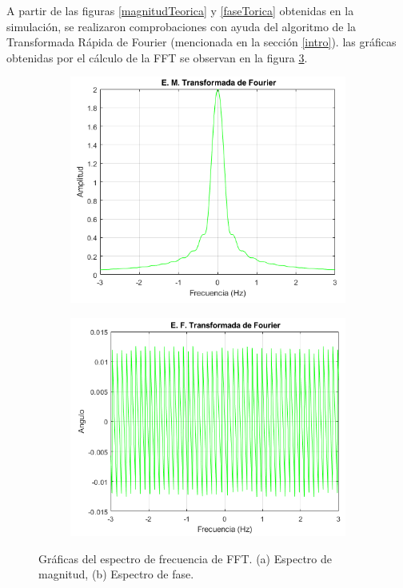 \documentclass[11pt,letterpaper,twocolumn]{article}
\begin{document}
        A partir de las figuras \ref{magnitudTeorica} y \ref{faseTorica} obtenidas en la simulación, se 
        realizaron comprobaciones con ayuda del algoritmo de la Transformada Rápida de Fourier (mencionada
        en la sección \ref{intro}). las gráficas obtenidas por el cálculo de la FFT se observan en la figura
        \ref{espectroFFT}.
        
        \begin{figure}[H]
            \centering 
            \begin{subfigure}[h]{0.49\linewidth}
                \includegraphics[width=\linewidth]{img/EMagnitudTF_FFT.png}
                \label{magnitudFFT}
                \caption{}
            \end{subfigure}
            \begin{subfigure}[h]{0.49\linewidth}
                \includegraphics[width=\linewidth]{img/EFaseTF_FFT.png}
                \label{faseFFT}
                \caption{}
            \end{subfigure}
            \caption{Gráficas del espectro de frecuencia de FFT. (a) Espectro de magnitud, (b) Espectro de 
                    fase.}
            \label{espectroFFT}
        \end{figure}
        
\end{document}
